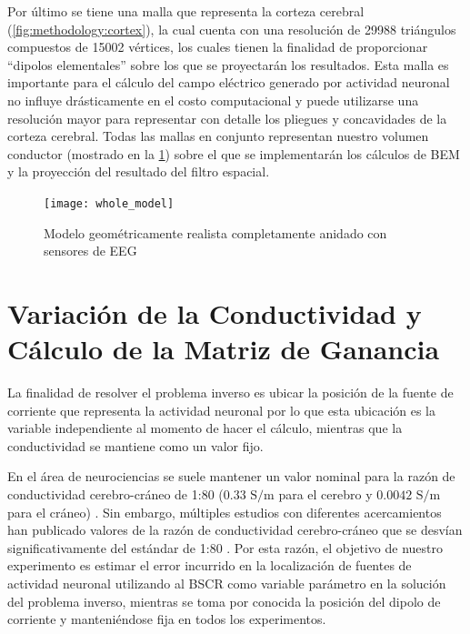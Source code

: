 Por último se tiene una malla que representa la corteza cerebral (\cref{fig:methodology:cortex}), la cual cuenta con una resolución de 29988 triángulos compuestos de 15002 vértices, los cuales tienen la finalidad de proporcionar ``dipolos elementales'' sobre los que se proyectarán los resultados. 
Esta malla es importante para el cálculo del campo eléctrico generado por actividad neuronal no influye drásticamente en el costo computacional y puede utilizarse una resolución mayor para representar con detalle los pliegues y concavidades de la corteza cerebral.
Todas las mallas en conjunto representan nuestro volumen conductor (mostrado en la \cref{fig:methodology:model}) sobre el que se implementarán los cálculos de BEM y la proyección del resultado del filtro espacial.

\begin{figure}[tbp]
	\texttt{[image: whole\_model]}
	\caption{Modelo geométricamente realista completamente anidado con sensores de EEG}
	\label{fig:methodology:model}
\end{figure}

\section{Variación de la Conductividad y Cálculo de la Matriz de Ganancia}
\label{sec:methodology:openmeeg}

La finalidad de resolver el problema inverso es ubicar la posición de la fuente de corriente que representa la actividad neuronal por lo que esta ubicación es la variable independiente al momento de hacer el cálculo, mientras que la conductividad se mantiene como un valor fijo.

En el área de neurociencias se suele mantener un valor nominal para la razón de conductividad cerebro-cráneo de 1:80 ($0.33\text{ S/m}$ para el cerebro y $0.0042 \text{ S/m}$ para el cráneo) \cite{Rush1968,Rush1969,Cohen1983}.
Sin embargo, múltiples estudios con diferentes acercamientos han publicado valores de la razón de conductividad cerebro-cráneo que se desvían significativamente del estándar de 1:80 \cite{McCann2019}.
Por esta razón, el objetivo de nuestro experimento es estimar el error incurrido en la localización de fuentes de actividad neuronal utilizando al BSCR como variable parámetro en la solución del problema inverso, mientras se toma por conocida la posición del dipolo de corriente y manteniéndose fija en todos los experimentos.

